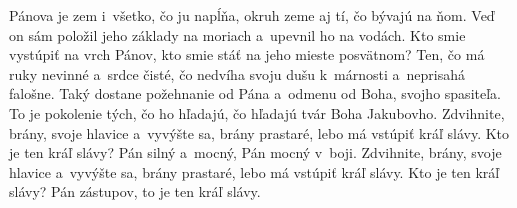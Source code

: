 Pánova je zem i~všetko, čo ju napĺňa,
okruh zeme aj tí, čo bývajú na ňom.
\versseparator
Veď on sám položil jeho základy na moriach
a~upevnil ho na vodách.
\versseparator
Kto smie vystúpiť na vrch Pánov,
kto smie stáť na jeho mieste posvätnom?
\versseparator
Ten, čo má ruky nevinné a~srdce čisté,
čo nedvíha svoju dušu k~márnosti
a~neprisahá falošne.
\versseparator
Taký dostane požehnanie od Pána
a~odmenu od Boha, svojho spasiteľa.
\versseparator
To je pokolenie tých, čo ho hľadajú,
čo hľadajú tvár Boha Jakubovho.
\versseparator
Zdvihnite, brány, svoje hlavice
a~vyvýšte sa, brány prastaré,
lebo má vstúpiť kráľ slávy.
\versseparator
Kto je ten kráľ slávy?
Pán silný a~mocný,
Pán mocný v~boji.
\versseparator
Zdvihnite, brány, svoje hlavice
a~vyvýšte sa, brány prastaré,
lebo má vstúpiť kráľ slávy.
\versseparator
Kto je ten kráľ slávy?
Pán zástupov, to je ten kráľ slávy.
